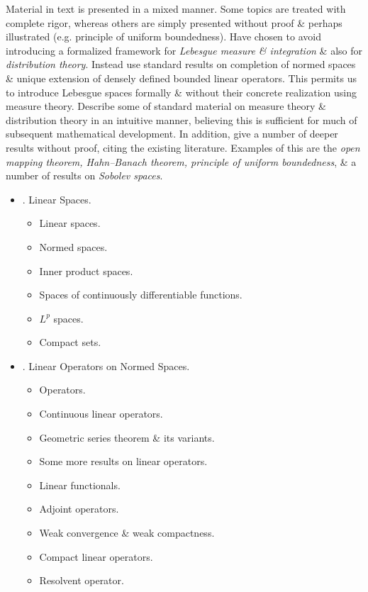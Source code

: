 \documentclass{article}
\begin{document}
\begin{enumerate}
	Material in text is presented in a mixed manner. Some topics are treated with complete rigor, whereas others are simply presented without proof \& perhaps illustrated (e.g. principle of uniform boundedness). Have chosen to avoid introducing a formalized framework for {\it Lebesgue measure \& integration} \& also for {\it distribution theory}. Instead use standard results on completion of normed spaces \& unique extension of densely defined bounded linear operators. This permits us to introduce Lebesgue spaces formally \& without their concrete realization using measure theory. Describe some of standard material on measure theory \& distribution theory in an intuitive manner, believing this is sufficient for much of subsequent mathematical development. In addition, give a number of deeper results without proof, citing the existing literature. Examples of this are the {\it open mapping theorem, Hahn--Banach theorem, principle of uniform boundedness}, \& a number of results on {\it Sobolev spaces}.	
	\begin{itemize}
		\item {. Linear Spaces.}
		\begin{itemize}
			\item {\sf Linear spaces.}
			\item {\sf Normed spaces.}
			\item {\sf Inner product spaces.}
			\item {\sf Spaces of continuously differentiable functions.}
			\item {\sf$L^p$ spaces.}
			\item {\sf Compact sets.}
		\end{itemize}
		\item {. Linear Operators on Normed Spaces.}
		\begin{itemize}
			\item {\sf Operators.}
			\item {\sf Continuous linear operators.}
			\item {\sf Geometric series theorem \& its variants.}
			\item {\sf Some more results on linear operators.}
			\item {\sf Linear functionals.}
			\item {\sf Adjoint operators.}
			\item {\sf Weak convergence \& weak compactness.}
			\item {\sf Compact linear operators.}
			\item {\sf Resolvent operator.}

\end{itemize}
\end{itemize}
\end{enumerate}
\end{document}

